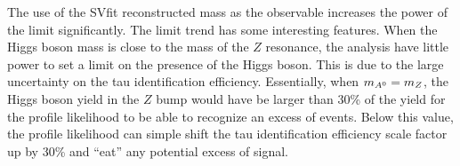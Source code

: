 %
The use of the SVfit reconstructed mass as the observable increases the power of
the limit significantly. The limit trend has some interesting features.   When
the Higgs boson mass is close to the mass of the $Z$ resonance, the analysis have
little power to set a limit on the presence of the Higgs boson.  This is due to the
large uncertainty on the tau identification efficiency.  Essentially, when
\mbox{$m_{A^0} = m_Z$}, the Higgs boson yield in the $Z$ bump would have be larger than
30\% of the \ZTT yield for the profile likelihood to be able to recognize an
excess of events. Below this value, the profile likelihood can simple shift the
tau identification efficiency scale factor up by 30\% and ``eat'' any potential
excess of signal.

